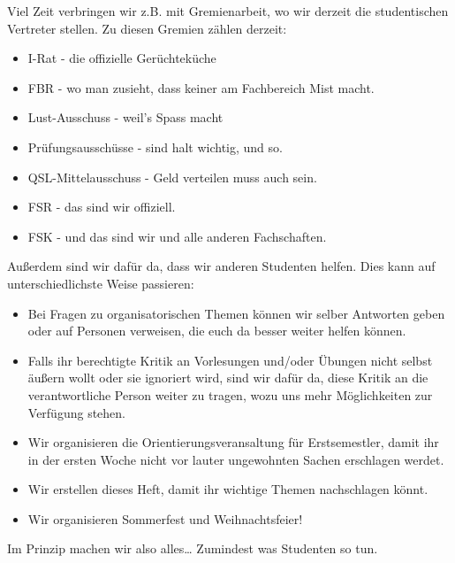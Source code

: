         Viel Zeit verbringen wir z.B. mit Gremienarbeit, wo wir derzeit die studentischen Vertreter stellen. Zu diesen Gremien zählen derzeit:
		\begin{itemize}
			\item I-Rat - die offizielle Ger\"uchtek\"uche
			\item FBR - wo man zusieht, dass keiner am Fachbereich Mist macht.
			\item Lust-Ausschuss - weil's Spass macht
			\item Prüfungsausschüsse - sind halt wichtig, und so.
			\item QSL-Mittelausschuss - Geld verteilen muss auch sein.
			\item FSR - das sind wir offiziell.
			\item FSK - und das sind wir und alle anderen Fachschaften.
		\end{itemize}
		Au{\ss}erdem sind wir daf\"ur da, dass wir anderen Studenten helfen. Dies kann auf unterschiedlichste Weise passieren:
		\begin{itemize}
			\item Bei Fragen zu organisatorischen Themen können wir selber Antworten geben oder auf Personen verweisen, die euch da besser weiter helfen können.
			\item Falls ihr berechtigte Kritik an Vorlesungen und/oder Übungen nicht selbst äußern wollt oder sie ignoriert wird, sind wir dafür da, diese Kritik an die verantwortliche Person weiter zu tragen, wozu uns mehr Möglichkeiten zur Verfügung stehen.
			\item Wir organisieren die Orientierungsveransaltung für Erstsemestler, damit ihr in der ersten Woche nicht vor lauter ungewohnten Sachen erschlagen werdet.
			\item Wir erstellen dieses Heft, damit ihr wichtige Themen nachschlagen könnt.
			\item Wir organisieren Sommerfest und Weihnachtsfeier!
		\end{itemize}
        Im Prinzip machen wir also alles\dots\hspace{1cm} Zumindest was Studenten so tun.
        


		
